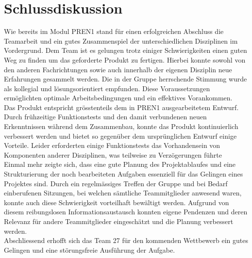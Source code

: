 \section{Schlussdiskussion}
Wie bereits im Modul PREN1 stand für einen erfolgreichen Abschluss die 
Teamarbeit und ein gutes Zusammenspiel der unterschiedlichen Disziplinen im 
Vordergrund. Dem Team ist es gelungen trotz einiger Schwierigkeiten einen 
guten Weg zu finden um das geforderte Produkt zu fertigen. Hierbei konnte 
sowohl von den anderen Fachrichtungen sowie auch innerhalb der eigenen 
Disziplin neue Erfahrungen gesammelt werden. Die in der Gruppe herrschende 
Stimmung wurde als kollegial und lösungsorientiert empfunden. Diese 
Voraussetzungen ermöglichten optimale Arbeitsbedingungen und ein effektives 
Vorankommen.\\

\noindent
Das Produkt entspricht grösstenteils  dem in PREN1 ausgearbeitetem Entwurf. 
Durch frühzeitige Funktionstests und den damit verbundenen neuen Erkenntnissen 
während dem Zusammenbau, konnte das Produkt kontinuierlich verbessert werden 
und bietet so gegenüber dem ursprünglichen Entwurf einige Vorteile. Leider 
erforderten einige Funktionstests das Vorhandensein von Komponenten anderer 
Disziplinen, was teilweise zu Verzögerungen führte\\

\noindent
Einmal mehr zeigte sich, dass eine gute Planung des Projektablaufes und eine 
Strukturierung der noch bearbeiteten Aufgaben essenziell für das Gelingen 
eines Projektes sind. Durch ein regelmässiges Treffen der Gruppe und bei 
Bedarf einberufenen Sitzungen, bei welchen sämtliche Teammitglieder anwesend 
waren, konnte auch diese Schwierigkeit vorteilhaft bewältigt werden. Aufgrund 
von diesem reibungslosen Informationsaustausch konnten eigene Pendenzen und 
deren Relevanz für andere Teammitglieder eingeschätzt und die Planung 
verbessert werden.\\

\noindent
Abschliessend erhofft sich das Team 27 für den kommenden Wettbewerb ein gutes 
Gelingen und eine störungsfreie Ausführung der Aufgabe.\\
